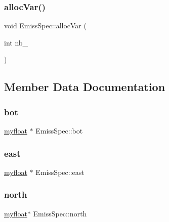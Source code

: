 \subsubsection{\texorpdfstring{alloc\+Var()}{allocVar()}}
{\footnotesize\ttfamily void Emiss\+Spec\+::alloc\+Var (\begin{DoxyParamCaption}\item[{int}]{nb\+\_\+ }\end{DoxyParamCaption})\hspace{0.3cm}{\ttfamily [inline]}}



\subsection{Member Data Documentation}
\mbox{\label{structEmissSpec_a51fa5634d8a326cb667a62bba9931e4f}} 
\subsubsection{\texorpdfstring{bot}{bot}}
{\footnotesize\ttfamily \hyperlink{param_8h_a5f097c9f3873af7be7fc156e6a06ca5e}{myfloat} $\ast$ Emiss\+Spec\+::bot}

\mbox{\label{structEmissSpec_a10262cb920a979a55e6a556452f4e1c2}} 
\subsubsection{\texorpdfstring{east}{east}}
{\footnotesize\ttfamily \hyperlink{param_8h_a5f097c9f3873af7be7fc156e6a06ca5e}{myfloat} $\ast$ Emiss\+Spec\+::east}

\mbox{\label{structEmissSpec_a4fa3d368c2b64274a109009098f85bbe}} 
\subsubsection{\texorpdfstring{north}{north}}
{\footnotesize\ttfamily \hyperlink{param_8h_a5f097c9f3873af7be7fc156e6a06ca5e}{myfloat}$\ast$ Emiss\+Spec\+::north}

\mbox{\label{structEmissSpec_a49e416cf35f060c46c97e95b389e3aff}} 

